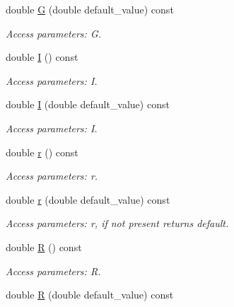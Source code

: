 \begin{DoxyCompactItemize}
double \hyperlink{struct_d_d4hep_1_1_x_m_l_1_1_dimension_ac3414e227bb3ded9073db905d153f0cf}{G} (double default\_\-value) const 
\begin{DoxyCompactList}\small\item\em Access parameters: G. \item\end{DoxyCompactList}\item 
double \hyperlink{struct_d_d4hep_1_1_x_m_l_1_1_dimension_a89459b10038dd52bd1652e95f4229c1c}{I} () const 
\begin{DoxyCompactList}\small\item\em Access parameters: I. \item\end{DoxyCompactList}\item 
double \hyperlink{struct_d_d4hep_1_1_x_m_l_1_1_dimension_adb8e6bcde8a36e200891bb1ef77b12b8}{I} (double default\_\-value) const 
\begin{DoxyCompactList}\small\item\em Access parameters: I. \item\end{DoxyCompactList}\item 
double \hyperlink{struct_d_d4hep_1_1_x_m_l_1_1_dimension_a268d60ab28cdeaa6781cd10f8a0293bd}{r} () const 
\begin{DoxyCompactList}\small\item\em Access parameters: r. \item\end{DoxyCompactList}\item 
double \hyperlink{struct_d_d4hep_1_1_x_m_l_1_1_dimension_ab945b3a0932b1d8ee96224b35064fd79}{r} (double default\_\-value) const 
\begin{DoxyCompactList}\small\item\em Access parameters: r, if not present returns default. \item\end{DoxyCompactList}\item 
double \hyperlink{struct_d_d4hep_1_1_x_m_l_1_1_dimension_aa41c99f0c240e07ced8f41f70b5e8bcf}{R} () const 
\begin{DoxyCompactList}\small\item\em Access parameters: R. \item\end{DoxyCompactList}\item 
double \hyperlink{struct_d_d4hep_1_1_x_m_l_1_1_dimension_aa4f4694169e94f3050a1698cebaeb438}{R} (double default\_\-value) const 

\end{DoxyCompactItemize}
